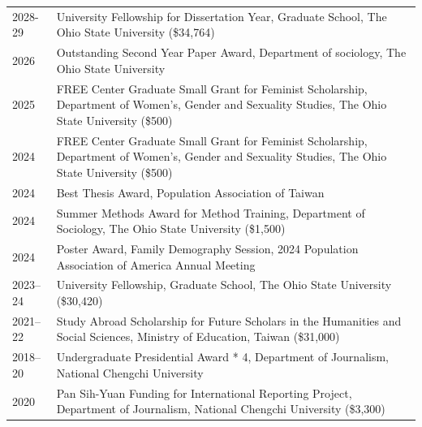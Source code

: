 
\begin{longtable}[l]{@{}p{} p{}}

    2028-29  & University Fellowship for Dissertation Year, Graduate School, The Ohio State University (\$34,764) \\

    2026 &  Outstanding Second Year Paper Award, Department of sociology, The Ohio State University \\
    
    2025 & FREE Center Graduate Small Grant for Feminist Scholarship, Department of Women's, Gender and Sexuality Studies, The Ohio State University (\$500) \\
    
    2024 & FREE Center Graduate Small Grant for Feminist Scholarship, Department of Women's, Gender and Sexuality Studies, The Ohio State University (\$500) \\
    
    2024 & Best Thesis Award, Population Association of Taiwan \\
    
    2024 & Summer Methods Award for Method Training, Department of Sociology, The Ohio State University (\$1,500) \\
    
    2024 & Poster Award, Family Demography Session, 2024 Population Association of America Annual Meeting \\
    
    2023--24 & University Fellowship, Graduate School, The Ohio State University (\$30,420) \\
    
    2021--22 & Study Abroad Scholarship for Future Scholars in the Humanities and Social Sciences, Ministry of Education, Taiwan  (\$31,000) \\

    2018--20 & Undergraduate Presidential Award * 4, Department of Journalism, National Chengchi University \\

    2020 & Pan Sih-Yuan Funding for International Reporting Project, Department of Journalism, National Chengchi University (\$3,300) 


   
\end{longtable}
